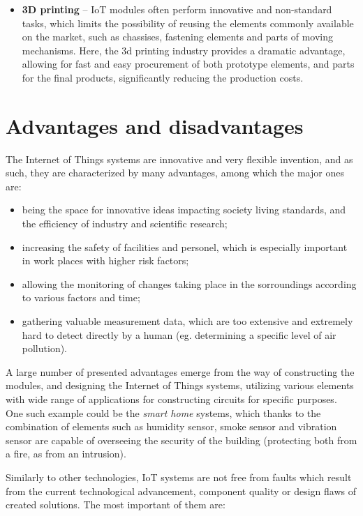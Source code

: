 \begin{itemize}
	\item [$\bullet$] \textbf{3D printing} -- IoT modules often perform innovative and non-standard tasks, which limits the possibility of reusing the elements commonly available on the market, such as chassises, fastening elements and parts of moving mechanisms. Here, the 3d printing industry provides a dramatic advantage, allowing for fast and easy procurement of both prototype elements, and parts for the final products, significantly reducing the production costs.
\end{itemize}

\section{Advantages and disadvantages}
	The Internet of Things systems are innovative and very flexible invention, and as such, they are characterized by many advantages, among which the major ones are:

	\begin{itemize}
		\item [$\bullet$] being the space for innovative ideas impacting society living standards, and the efficiency of industry and scientific research;
		\item [$\bullet$] increasing the safety of facilities and personel, which is especially important in work places with higher risk factors;
		\item [$\bullet$] allowing the monitoring of changes taking place in the sorroundings according to various factors and time;
		\item [$\bullet$] gathering valuable measurement data, which are too extensive and extremely hard to detect directly by a human (eg. determining a specific level of air pollution).
	\end{itemize}

	A large number of presented advantages emerge from the way of constructing the modules, and designing the Internet of Things systems, utilizing various elements with wide range of applications for constructing circuits for specific purposes. One such example could be the \emph{smart home} systems, which thanks to the combination of elements such as humidity sensor, smoke sensor and vibration sensor are capable of overseeing the security of the building (protecting both from a fire, as from an intrusion).

	Similarly to other technologies, IoT systems are not free from faults which result from the current technological advancement, component quality or design flaws of created solutions. The most important of them are:
    
